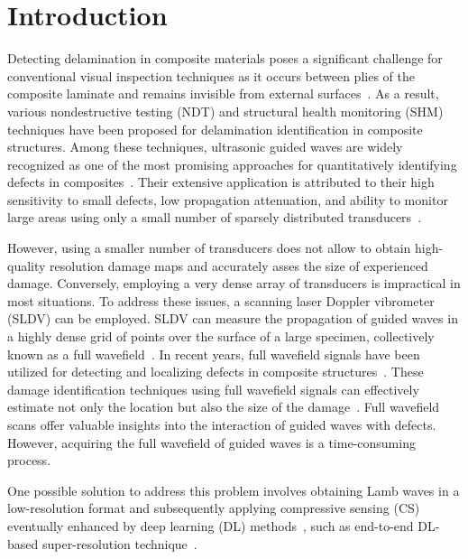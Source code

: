 \section{Introduction}

Detecting delamination in composite materials poses a significant challenge for conventional visual inspection techniques as it occurs between plies of the composite laminate and remains invisible from external surfaces~\cite{staszewski2009health, tuo2019damage}. 
As a result, various nondestructive testing (NDT) and structural health 
monitoring (SHM) techniques have been proposed for delamination identification 
in composite structures. 
Among these techniques, ultrasonic guided waves are widely recognized as one of 
the most promising approaches for quantitatively identifying defects in 
composites~\cite{tian2015delamination, munian2018lamb}. 
Their extensive application is attributed to their high sensitivity to small defects, low propagation attenuation, and ability to monitor large areas using only a small number of sparsely distributed transducers~\cite{Barthorpe2020, Ihn2008, Cantero-Chinchilla2020}.

However, using a smaller number of transducers does not allow to obtain 
high-quality resolution damage maps and accurately asses the size of 
experienced damage. 
Conversely, employing a very dense array of transducers is impractical in most 
situations. To address these issues, a scanning laser Doppler vibrometer (SLDV) 
can be employed. 
SLDV can measure the propagation of guided waves in a highly dense grid of points over the surface of a large specimen, collectively known as a full wavefield~\cite{Radzienski2019a}. 
In recent years, full wavefield signals have been utilized for detecting and localizing defects in composite structures~\cite{Radzienski2019a, Girolamo2018a, kudela2018impact, rogge2013characterization}. 
These damage identification techniques using full wavefield signals can 
effectively estimate not only the location but also the size of the 
damage~\cite{Girolamo2018a, kudela2018impact}. 
Full wavefield scans offer valuable insights into the interaction of guided waves with defects. However, acquiring the full wavefield of guided waves is a time-consuming process.

One possible solution to address this problem involves obtaining Lamb waves in 
a low-resolution format and subsequently applying compressive sensing (CS) 
eventually enhanced by deep learning (DL) methods~\cite{esfandabadideep}, such 
as end-to-end DL-based super-resolution technique~\cite{ijjeh2023deep}. 

